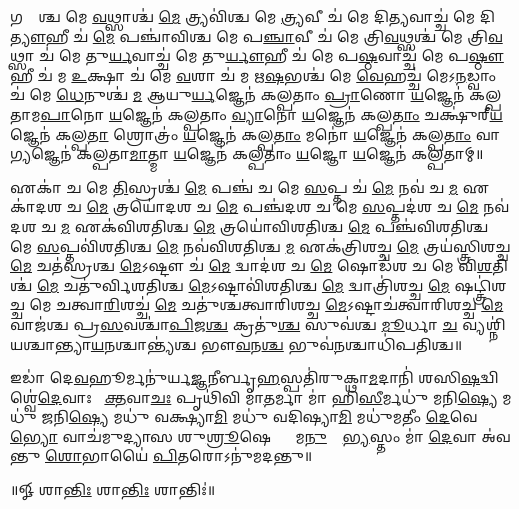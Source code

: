 𑌗𑌰𑍍𑌭𑌾᳚𑌶𑍍𑌚 𑌮𑍇 \ul{𑌵}𑌥𑍍𑌸𑌾𑌶𑍍𑌚॑ \ul{𑌮𑍇} 𑌤𑍍𑌰𑍍𑌯𑌵𑌿॑𑌶𑍍𑌚 𑌮𑍇 \ul{𑌤𑍍𑌰𑍍𑌯}𑌵𑍀 𑌚॑ 𑌮𑍇 𑌦𑌿\ul{𑌤𑍍𑌯}𑌵𑌾𑌚𑍍𑌚॑ 𑌮𑍇 𑌦𑌿\ul{𑌤𑍍𑌯𑍗}𑌹𑍀 𑌚॑ \ul{𑌮𑍇} 𑌪𑌞𑍍𑌚𑌾॑𑌵𑌿𑌶𑍍𑌚 𑌮𑍇 𑌪\ul{𑌞𑍍𑌚𑌾}𑌵𑍀 𑌚॑ 𑌮𑍇 𑌤𑍍𑌰𑌿\ul{𑌵}𑌥𑍍𑌸𑌶𑍍𑌚॑ 𑌮𑍇 𑌤𑍍𑌰𑌿\ul{𑌵}𑌥𑍍𑌸𑌾 𑌚॑ 𑌮𑍇 𑌤𑍁\ul{𑌰𑍍𑌯}𑌵𑌾𑌚𑍍𑌚॑ 𑌮𑍇 𑌤𑍁\ul{𑌰𑍍𑌯𑍗}𑌹𑍀 𑌚॑ 𑌮𑍇 𑌪\ul{𑌷𑍍𑌠}𑌵𑌾𑌚𑍍𑌚॑ 𑌮𑍇 𑌪\ul{𑌷𑍍𑌠𑍗}𑌹𑍀 𑌚॑ 𑌮 \ul{𑌉}𑌕𑍍𑌷𑌾 𑌚॑ 𑌮𑍇 \ul{𑌵}𑌶𑌾 𑌚॑ 𑌮 𑌋\ul{𑌷}𑌭𑌶𑍍𑌚॑ 𑌮𑍇 \ul{𑌵𑍇}𑌹𑌚𑍍𑌚॑ 𑌮𑍇𑌽\ul{𑌨}𑌡𑍍𑌵𑌾𑌂 𑌚॑ 𑌮𑍇 \ul{𑌧𑍇}𑌨𑍁𑌶𑍍𑌚॑ \ul{𑌮} 𑌆𑌯𑍁\ul{𑌰𑍍𑌯}𑌜𑍍𑌞𑍇𑌨॑ 𑌕𑌲𑍍𑌪𑌤𑌾𑌂 \ul{𑌪𑍍𑌰𑌾}𑌣𑍋 \ul{𑌯}𑌜𑍍𑌞𑍇𑌨॑ 𑌕𑌲𑍍𑌪𑌤𑌾𑌮\ul{𑌪𑌾}𑌨𑍋 \ul{𑌯}𑌜𑍍𑌞𑍇𑌨॑ 𑌕𑌲𑍍𑌪𑌤𑌾𑌂 \ul{𑌵𑍍𑌯𑌾}𑌨𑍋 \ul{𑌯}𑌜𑍍𑌞𑍇𑌨॑ 𑌕𑌲𑍍𑌪\ul{𑌤𑌾𑌂} 𑌚𑌕𑍍𑌷𑍁॑𑌰𑍍‌\ul{𑌯}𑌜𑍍𑌞𑍇𑌨॑ 𑌕𑌲𑍍𑌪\ul{𑌤𑌾}\ul{} 𑌶𑍍𑌰𑍋𑌤𑍍𑌰𑌂॑ \ul{𑌯}𑌜𑍍𑌞𑍇𑌨॑ 𑌕𑌲𑍍𑌪\ul{𑌤𑌾𑌂} 𑌮𑌨𑍋॑ \ul{𑌯}𑌜𑍍𑌞𑍇𑌨॑ 𑌕𑌲𑍍𑌪\ul{𑌤𑌾𑌂} 𑌵𑌾\ul{𑌗𑍍𑌯}𑌜𑍍𑌞𑍇𑌨॑ 𑌕𑌲𑍍𑌪𑌤𑌾\ul{𑌮𑌾}𑌤𑍍𑌮𑌾 \ul{𑌯}𑌜𑍍𑌞𑍇𑌨॑ 𑌕𑌲𑍍𑌪𑌤𑌾𑌂 \ul{𑌯}𑌜𑍍𑌞𑍋 \ul{𑌯}𑌜𑍍𑌞𑍇𑌨॑ 𑌕𑌲𑍍𑌪𑌤𑌾𑌮𑍍॥ 


𑌏𑌕𑌾॑ 𑌚 𑌮𑍇 \ul{𑌤𑌿}𑌸𑍍𑌰𑌶𑍍𑌚॑ \ul{𑌮𑍇} 𑌪𑌞𑍍𑌚॑ 𑌚 𑌮𑍇 \ul{𑌸}𑌪𑍍𑌤 𑌚॑ \ul{𑌮𑍇} 𑌨𑌵॑ 𑌚 \ul{𑌮} 𑌏𑌕𑌾॑𑌦𑌶 𑌚 \ul{𑌮𑍇} 𑌤𑍍𑌰𑌯𑍋॑𑌦𑌶 𑌚 \ul{𑌮𑍇} 𑌪𑌞𑍍𑌚॑𑌦𑌶 𑌚 𑌮𑍇 \ul{𑌸}𑌪𑍍𑌤𑌦॑𑌶 𑌚 \ul{𑌮𑍇} 𑌨𑌵॑𑌦𑌶 𑌚 \ul{𑌮} 𑌏𑌕॑𑌵𑌿𑌶𑌤𑌿𑌶𑍍𑌚 \ul{𑌮𑍇} 𑌤𑍍𑌰𑌯𑍋॑𑌵𑌿𑌶𑌤𑌿𑌶𑍍𑌚 \ul{𑌮𑍇} 𑌪𑌞𑍍𑌚॑𑌵𑌿𑌶𑌤𑌿𑌶𑍍𑌚 𑌮𑍇 \ul{𑌸}𑌪𑍍𑌤𑌵𑌿॑𑌶𑌤𑌿𑌶𑍍𑌚 \ul{𑌮𑍇} 𑌨𑌵॑𑌵𑌿𑌶𑌤𑌿𑌶𑍍𑌚 \ul{𑌮} 𑌏𑌕॑𑌤𑍍𑌰𑌿𑌶𑌚𑍍𑌚 \ul{𑌮𑍇} 𑌤𑍍𑌰𑌯॑𑌸𑍍𑌤𑍍𑌰𑌿𑌶𑌚𑍍𑌚 \ul{𑌮𑍇} 𑌚𑌤॑𑌸𑍍𑌰𑌶𑍍𑌚 \ul{𑌮𑍇}𑌽𑌷𑍍𑌟𑍗 𑌚॑ \ul{𑌮𑍇} 𑌦𑍍𑌵𑌾𑌦॑𑌶 𑌚 \ul{𑌮𑍇} 𑌷𑍋𑌡॑𑌶 𑌚 𑌮𑍇 𑌵𑌿\ul{𑌶}𑌤𑌿𑌶𑍍𑌚॑ \ul{𑌮𑍇} 𑌚𑌤𑍁॑𑌰𑍍𑌵𑌿𑌶𑌤𑌿𑌶𑍍𑌚 \ul{𑌮𑍇}𑌽𑌷𑍍𑌟𑌾𑌵𑌿॑𑌶𑌤𑌿𑌶𑍍𑌚 \ul{𑌮𑍇} 𑌦𑍍𑌵𑌾𑌤𑍍𑌰𑌿॑𑌶𑌚𑍍𑌚 \ul{𑌮𑍇} 𑌷𑌟𑍍𑌤𑍍𑌰𑌿॑𑌶𑌚𑍍𑌚 𑌮𑍇 𑌚𑌤𑍍𑌵𑌾\ul{𑌰𑌿}\ul{}𑌶𑌚𑍍𑌚॑ \ul{𑌮𑍇} 𑌚𑌤𑍁॑𑌶𑍍𑌚𑌤𑍍𑌵𑌾𑌰𑌿𑌶𑌚𑍍𑌚 \ul{𑌮𑍇}𑌽𑌷𑍍𑌟𑌾𑌚॑𑌤𑍍𑌵𑌾𑌰𑌿𑌶𑌚𑍍𑌚 \ul{𑌮𑍇} 𑌵𑌾𑌜॑𑌶𑍍𑌚 𑌪𑍍𑌰\ul{𑌸}𑌵𑌶𑍍𑌚𑌾॑\ul{𑌪𑌿}𑌜\ul{𑌶𑍍𑌚} 𑌕𑍍𑌰𑌤𑍁॑\ul{𑌶𑍍𑌚} 𑌸𑍁𑌵॑𑌶𑍍𑌚 \ul{𑌮𑍂}𑌰𑍍𑌧𑌾 \ul{𑌚} 𑌵𑍍𑌯𑌶𑍍𑌨𑌿॑𑌯𑌶𑍍𑌚𑌾𑌨𑍍𑌤𑍍𑌯𑌾\ul{𑌯}𑌨𑌶𑍍𑌚𑌾𑌨𑍍𑌤𑍍𑌯॑𑌶𑍍𑌚 𑌭𑍗\ul{𑌵}𑌨\ul{𑌶𑍍𑌚} 𑌭𑍁𑌵॑\ul{𑌨}𑌶𑍍𑌚𑌾𑌧𑌿॑𑌪𑌤𑌿𑌶𑍍𑌚॥ 


\lbrack 𑌇𑌡𑌾॑ 𑌦𑍇\ul{𑌵}𑌹𑍂𑌰𑍍𑌮𑌨𑍁॑𑌰𑍍𑌯\ul{𑌜𑍍𑌞}𑌨𑍀𑌰𑍍𑌬𑍃\ul{𑌹}𑌸𑍍𑌪𑌤𑌿॑𑌰𑍁𑌕𑍍𑌥𑌾\ul{𑌮}𑌦𑌾𑌨𑌿॑ 𑌶𑌸𑌿\ul{𑌷}𑌦𑍍𑌵𑌿𑌶𑍍𑌵𑍇॑\-\ul{𑌦𑍇}𑌵𑌾𑌃 𑌸𑍂᳚\ul{𑌕𑍍𑌤}𑌵𑌾\ul{𑌚𑌃} 𑌪𑍃𑌥𑌿॑𑌵𑌿 𑌮𑌾\ul{𑌤}𑌰𑍍𑌮𑌾 𑌮𑌾॑ 𑌹𑌿\ul{𑌸𑍀}𑌰𑍍𑌮𑌧𑍁॑ 𑌮𑌨𑌿\ul{𑌷𑍍𑌯𑍇} 𑌮𑌧𑍁॑ 𑌜𑌨𑌿\ul{𑌷𑍍𑌯𑍇} 𑌮𑌧𑍁॑ 𑌵𑌕𑍍𑌷𑍍𑌯𑌾\ul{𑌮𑌿} 𑌮𑌧𑍁॑ 𑌵𑌦𑌿𑌷𑍍𑌯𑌾\ul{𑌮𑌿} 𑌮𑌧𑍁॑𑌮𑌤𑍀𑌂 \ul{𑌦𑍇}𑌵𑍇\ul{𑌭𑍍𑌯𑍋} 𑌵𑌾𑌚॑𑌮𑍁𑌦𑍍𑌯𑌾𑌸 𑌶𑍁\ul{𑌶𑍍𑌰𑍂}𑌷𑍇𑌣𑍍𑌯𑌾𑌂᳚ 𑌮\ul{𑌨𑍁}𑌷𑍍𑌯𑍇᳚\ul{𑌭𑍍𑌯}𑌸𑍍𑌤𑌂 𑌮𑌾॑ \ul{𑌦𑍇}𑌵𑌾 𑌅॑𑌵𑌨𑍍𑌤𑍁 \ul{𑌶𑍋}𑌭𑌾𑌯𑍈॑ \ul{𑌪𑌿}𑌤𑌰𑍋𑌽𑌨𑍁॑𑌮𑌦𑌨𑍍𑌤𑍁॥\rbrack

\centerline{॥𑍐 𑌶𑌾\ul{𑌨𑍍𑌤𑌿𑌃} 𑌶𑌾\ul{𑌨𑍍𑌤𑌿𑌃} 𑌶𑌾𑌨𑍍𑌤𑌿𑌃॑॥}

{\small \closesection}
